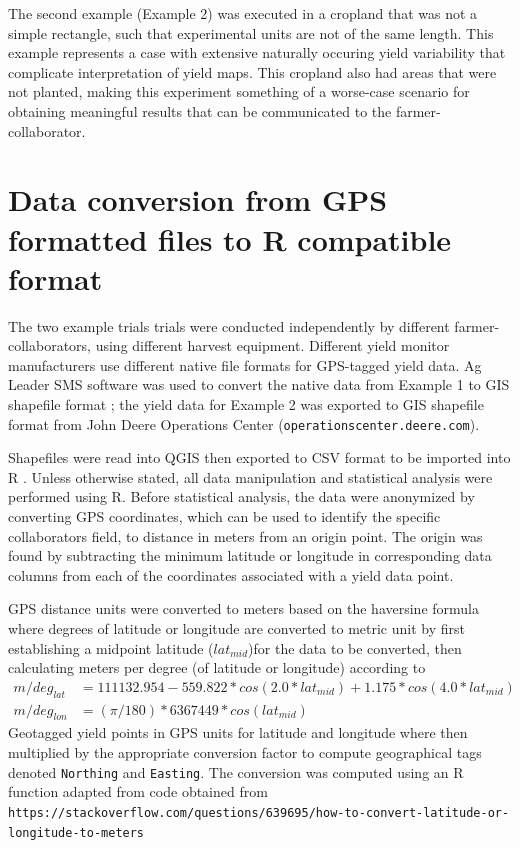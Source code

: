 \documentclass[phdcss]{SDSUThesis}
\begin{document}
The second example (Example 2) was executed in a cropland that was not a simple rectangle, such that experimental units are not of the same length. This example represents a case with extensive naturally occuring yield variability \cite{grisso-04-2009} that complicate interpretation of yield maps. This cropland also had areas that were not planted, making this experiment something of a worse-case scenario for obtaining meaningful results that can be communicated to the farmer-collaborator. 

\section{Data conversion from GPS formatted files to R compatible format}

The two example trials trials were conducted independently by different farmer-collaborators, using different harvest equipment. Different yield monitor manufacturers use different native file formats for GPS-tagged yield data. Ag Leader SMS software \cite{agleader} was used to convert the native data from Example 1 to GIS shapefile format \cite{listed-07-1998}; the yield data for Example 2 was exported to GIS shapefile format from John Deere Operations Center (\texttt{operationscenter.deere.com}). 

Shapefiles were read into QGIS \cite{qgis} then exported to CSV format to be imported into R \cite{rcore}. Unless otherwise stated, all data manipulation and statistical analysis were performed using R. Before statistical analysis, the data were anonymized by converting GPS coordinates, which can be used to identify the specific collaborators field, to distance in meters from an origin point. The origin was found by subtracting the minimum latitude or longitude in corresponding data columns from each of the coordinates associated with a yield data point. 

GPS distance units were converted to meters based on the haversine formula \cite{robusto-01-1957} where degrees of latitude or longitude are converted to metric unit by first establishing a midpoint latitude ($lat_{mid}$)for the data to be converted, then calculating meters per degree (of latitude or longitude) according to
\begin{equation}
   \begin{aligned}
      m/deg_{lat} & = 111132.954 - 559.822 * cos( 2.0 * lat_{mid} ) + 1.175 * cos( 4.0 * lat_{mid}) \\
      m/deg_{lon} &= (\pi/180 ) * 6367449 * cos ( lat_{mid} )
   \end{aligned}
\end{equation}
Geotagged yield points in GPS units for latitude and longitude where then multiplied by the appropriate conversion factor to compute geographical tags denoted \texttt{Northing} and \texttt{Easting}. The conversion was computed using an R function adapted from code obtained from \texttt{https://stackoverflow.com/questions/639695/how-to-convert-latitude-or-longitude-to-meters}
\end{document}
